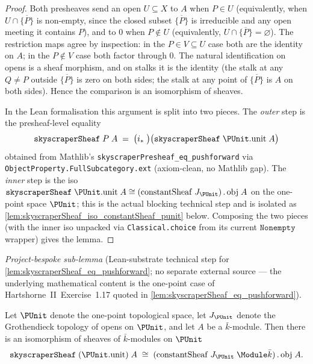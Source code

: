 \begin{proof}
  \leanok
  Both presheaves send an open \(U \subseteq X\) to \(A\) when
  \(P \in U\) (equivalently, when
  \(U \cap \overline{\{P\}}\) is non-empty, since the closed subset
  \(\overline{\{P\}}\) is irreducible and any open meeting it contains
  \(P\)), and to \(0\) when \(P \notin U\) (equivalently,
  \(U \cap \overline{\{P\}} = \varnothing\)). The restriction maps agree
  by inspection: in the \(P \in V \subseteq U\) case both are the
  identity on \(A\); in the \(P \notin V\) case both factor through
  \(0\). The natural identification on opens is a sheaf morphism, and
  on stalks it is the identity (the stalk at any \(Q \neq P\) outside
  \(\overline{\{P\}}\) is zero on both sides; the stalk at any point of
  \(\overline{\{P\}}\) is \(A\) on both sides). Hence the comparison is
  an isomorphism of sheaves.

  In the Lean formalisation this argument is split into two pieces.
  The \emph{outer} step is the presheaf-level equality
  \[
    \mathtt{skyscraperSheaf}\;P\;A \;=\;
      \bigl(i_*\;\bigr)
      \bigl(\mathtt{skyscraperSheaf}\;\PUnit.\mathrm{unit}\;A\bigr)
  \]
  obtained from Mathlib's \texttt{skyscraperPresheaf\_eq\_pushforward}
  via \texttt{ObjectProperty.FullSubcategory.ext} (axiom-clean, no
  Mathlib gap). The \emph{inner} step is the iso
  \(\mathtt{skyscraperSheaf}\;\PUnit.\mathrm{unit}\;A \cong
    (\mathrm{constantSheaf}\;J_{\PUnit})\,.\,\mathrm{obj}\;A\)
  on the one-point space \(\PUnit\); this is the actual blocking
  technical step and is isolated as
  \cref{lem:skyscraperSheaf_iso_constantSheaf_punit} below. Composing
  the two pieces (with the inner iso unpacked via
  \texttt{Classical.choice} from its current \(\mathtt{Nonempty}\)
  wrapper) gives the lemma.
\end{proof}

\begin{lemma}
  \label{lem:skyscraperSheaf_iso_constantSheaf_punit}
  \textit{Project-bespoke sub-lemma} (Lean-substrate technical step
  for \cref{lem:skyscraperSheaf_eq_pushforward}; no separate external
  source — the underlying mathematical content is the one-point case
  of Hartshorne~II~Exercise~1.17 quoted in
  \cref{lem:skyscraperSheaf_eq_pushforward}).

  Let \(\PUnit\) denote the one-point topological space, let
  \(J_{\PUnit}\) denote the Grothendieck topology of opens on
  \(\PUnit\), and let \(A\) be a \(\bar k\)-module. Then there is an
  isomorphism of sheaves of \(\bar k\)-modules on \(\PUnit\)
  \[
    \mathtt{skyscraperSheaf}\;(\PUnit.\mathrm{unit})\;A \;\cong\;
      (\mathrm{constantSheaf}\;J_{\PUnit}\;\Module \bar k)\,.\,\mathrm{obj}\;A.
  \]
\end{lemma}

